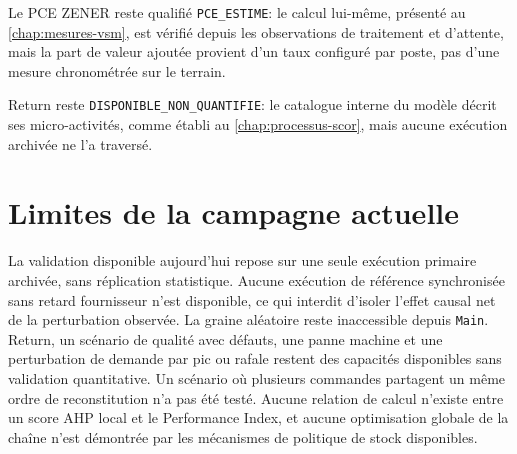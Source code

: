 Le PCE ZENER reste qualifié \texttt{PCE\_ESTIME}: le calcul lui-même, présenté au \cref{chap:mesures-vsm}, est vérifié depuis les observations de traitement et d'attente, mais la part de valeur ajoutée provient d'un taux configuré par poste, pas d'une mesure chronométrée sur le terrain.

\begin{sloppypar}
Return reste \texttt{DISPONIBLE\_NON\_QUANTIFIE}: le catalogue interne du modèle décrit ses micro-activités, comme établi au \cref{chap:processus-scor}, mais aucune exécution archivée ne l'a traversé.
\end{sloppypar}

\section{Limites de la campagne actuelle}

La validation disponible aujourd'hui repose sur une seule exécution primaire archivée, sans réplication statistique. Aucune exécution de référence synchronisée sans retard fournisseur n'est disponible, ce qui interdit d'isoler l'effet causal net de la perturbation observée. La graine aléatoire reste inaccessible depuis \texttt{Main}. Return, un scénario de qualité avec défauts, une panne machine et une perturbation de demande par pic ou rafale restent des capacités disponibles sans validation quantitative. Un scénario où plusieurs commandes partagent un même ordre de reconstitution n'a pas été testé. Aucune relation de calcul n'existe entre un score AHP local et le Performance Index, et aucune optimisation globale de la chaîne n'est démontrée par les mécanismes de politique de stock disponibles.

